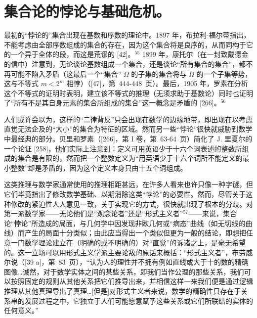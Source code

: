 \section*{集合论的悖论与基础危机。}
{}

最初的“悖论的”集合出现在基数和序数的理论中。1897 年，布拉利-福尔蒂指出，不能考虑由全部序数组成的集合的存在，因为这个集合将是良序的，从而同构于它的一个异于全体的段，而这是荒谬的 {[}42{]}。\(^{55}\) 1899 年，康托尔（在一封致戴德金的信中）注意到，无论谈论基数组成一个集合，还是谈论“所有集合的集合”，都不再可能不陷入矛盾（这最后一个“集合” \(\Omega\) 的子集的集合将与 \(\Omega\) 的一个子集等势，这与不等式 \(m < 2^{m}\) 相悖）（{[}47{]}，第~444-448~页）。最后，1905 年，罗素在分析这个不等式的证明时表明，建立该不等式的推理（无须求助于基数论）同时也证明了“所有不是其自身元素的集合所组成的集合”这一概念是矛盾的 {[}266{]}。\(^{56}\)

人们或许会以为，这样的“二律背反”只会出现在数学的边缘地带，即出现在以考虑直觉无法企及的“大小”的集合为特征的区域。然而另一些“悖论”很快就威胁到数学中最经典的部分。贝里和罗素（{[}266{]}，第 I 卷，第~63-64~页）简化了 J. 里夏尔的一个论证 {[}258{]}，他们实际上注意到：定义可用英语少于十六个词表述的整数所组成的集合是有限的，然而把一个整数定义为“用英语少于十六个词所不能定义的最小整数”却是矛盾的，因为这个定义本身只由十五个词组成。

这类推理与数学家通常使用的推理相距甚远，在许多人看来也许只像一种字谜，但它们毕竟指出了修改数学基础、以期消除这类“悖论”的必要性。然而，尽管关于这种修改的紧迫性人人意见一致，关于实现它的方式，很快就出现了根本的分歧。对第一派数学家——无论他们是“观念论者”还是“形式主义者”\(^{57}\)——来说，集合论“悖论”所造成的局面，与几何学中因发现非欧几何或“病态”曲线（如无切线的曲线）而产生的局面十分类似；由此应当得出一个类似但更为一般的结论，即想把任意一门数学理论建立在（明确的或不明确的）对“直觉”的诉诸之上，是毫无希望的。这一立场可以用形式主义学派主要论敌的原话来概括：“形式主义者”，布劳威尔说（{[}39 a{]}，第~83~页），“认为人的理性并不拥有例如直线或大于十的数的精确图像\ldots 诚然，对于数学实体之间的某些关系，即我们当作公理的那些关系，我们可以按照固定的规则从其他关系把它们推导出来，并相信这样一来我们便是通过逻辑推理从其他真理导出了真理\ldots{[}但是{]}对形式主义者来说，数学的精确性只存在于关系串的发展过程之中，它独立于人们可能愿意赋予这些关系或它们所联结的实体的任何意义。”

